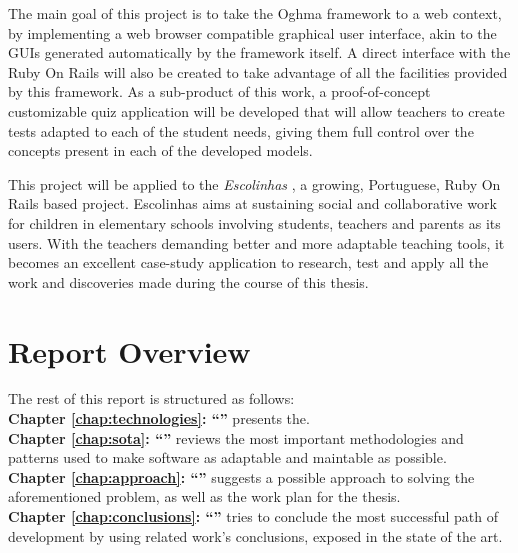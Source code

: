 The main goal of this project is to take the Oghma framework \cite{FCA09} to a web context, by implementing a web browser compatible graphical user interface, akin to the GUIs generated automatically by the framework itself. A direct interface with the Ruby On Rails will also be created to take advantage of all the facilities provided by this framework. As a sub-product of this work, a proof-of-concept customizable quiz application will be developed that will allow teachers to create tests adapted to each of the student needs, giving them full control over the concepts present in each of the developed models.

This project will be applied to the \textit{Escolinhas} \cite{escolinhas}, a growing, Portuguese, Ruby On Rails based project. Escolinhas aims at sustaining social and collaborative work for children in elementary schools involving students, teachers and parents as its users. With the teachers demanding better and more adaptable teaching tools, it becomes an excellent case-study application to research, test and apply all the work and discoveries made during the course of this thesis.

\section{Report Overview}\label{sec:structure}

The rest of this report is structured as follows:\\

\textbf{Chapter \ref{chap:technologies}: ``'' } presents the.\\

\textbf{Chapter \ref{chap:sota}: ``'' } reviews the most important methodologies and patterns used to make software as adaptable and maintable as possible.\\

\textbf{Chapter \ref{chap:approach}: ``'' } suggests a possible approach to solving the aforementioned problem, as well as the work plan for the thesis.\\

\textbf{Chapter \ref{chap:conclusions}: ``'' } tries to conclude the most successful path of development by using related work’s conclusions, exposed in the state of the art. %

